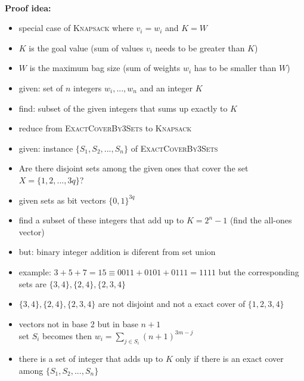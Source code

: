 \documentclass[a4]{scrartcl}
\begin{document}
\ \\
\textbf{Proof idea:}
\begin{itemize}
\item special case of \textsc{Knapsack} where $v_i = w_i$ and $K = W$
\item $K$ is the goal value (sum of values $v_i$ needs to be greater than $K$)
\item $W$ is the maximum bag size (sum of weights $w_i$ has to be smaller than $W$)
\item given: set of $n$ integers $w_i,...,w_n$ and an integer $K$
\item find: subset of the given integers that sums up exactly to $K$ \\

\item reduce from \textsc{ExactCoverBy3Sets} to \textsc{Knapsack}
\item given: instance $\{ S_1, S_2,...,S_n \}$ of \textsc{ExactCoverBy3Sets}
\item Are there disjoint sets among the given ones that cover the set $X=\{1,2,...,3q\}$?
\item given sets as bit vectors $\{0,1\}^{3q}$
\item find a subset of these integers that add up to $K = 2^n -1$ (find the all-ones vector)
\item but: binary integer addition is diferent from set union
\item example: $3+5+7 = 15 \equiv 0011+0101+0111 = 1111$ but the corresponding sets are $\{3,4\},\{2,4\},\{2,3,4\}$
\item $\{3,4\},\{2,4\},\{2,3,4\}$ are not disjoint and not a exact cover of $\{1,2,3,4\}$
\item vectors not in base 2 but in base $n+1$ \\
set $S_i$ becomes then $w_i= \sum_{j \in S_i}(n+1)^{3m-j}$
\item there is a set of integer that adds up to $K$ only if there is an exact cover among $\{ S_1, S_2,...,S_n \}$

\end{itemize}








\newpage

\printbibliography
\end{document}
